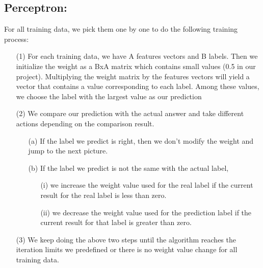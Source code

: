 \documentclass[11pt]{article}
\begin{document}
		\subsection*{Perceptron:}
			\flushleft{}For all training data, we pick them one by one to do the following training process:
			\begin{itemize}
				\item[(1)]For each training data, we have A features vectors and B labels. Then we initialize the weight as a BxA matrix which contains small values (0.5 in our project). Multiplying the weight matrix by the features vectors will yield a vector that contains a value corresponding to each label. Among these values, we choose the label with the largest value as our prediction
				\item[(2)] We compare our prediction with the actual answer and take different actions depending on the comparison result.\\
				\begin{itemize}
					\item[(a)] If the label we predict is right, then we don’t modify the weight and jump to the next picture.
					\item[(b)] If the label we predict is not the same with the actual label,
					\begin{itemize}
						\item[(i)] we increase the weight value used for the real label if the current result for the real label is less than zero.
						\item[(ii)] we decrease the weight value used for the prediction label if the current result for that label is greater than zero.
					\end{itemize}
				\end{itemize}
				\item[(3)] We keep doing the above two steps until the algorithm reaches the iteration limits we predefined or there is no weight value change for all training data.
			\end{itemize}
\end{document}
